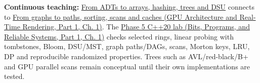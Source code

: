 \textbf{Continuous teaching:} \hyperref[01-foundations-i-ch007-the-scene-is-now-too-large-for-the-wrong-container-phase-5-m025m027-parts-401445]{From ADTs to arrays, hashing, trees and DSU} connects to \href{../06-GPU-Architecture-and-Real-Time-Rendering-P01/main.pdf\#nameddest=01-foundations-i-ch008-from-an-asset-map-to-a-correct-navigable-world-phase-5-m028m030-parts-446500}{From graphs to paths, sorting, scans and caches (GPU Architecture and Real-Time Rendering, Part 1, Ch. 1)}. The \href{../01-Bits-Programs-and-Reliable-Systems-P01/main.pdf\#nameddest=source-file-0ec69e1a1a11439bca29faa5}{Phase 5 C++20 lab (Bits, Programs, and Reliable Systems, Part 1, Ch. 1)} checks selected rings, linear probing with tombstones, Bloom, DSU/MST, graph paths/DAGs, scans, Morton keys, LRU, DP and reproducible randomized properties. Trees such as AVL/red-black/B+ and GPU parallel scans remain conceptual until their own implementations are tested.

